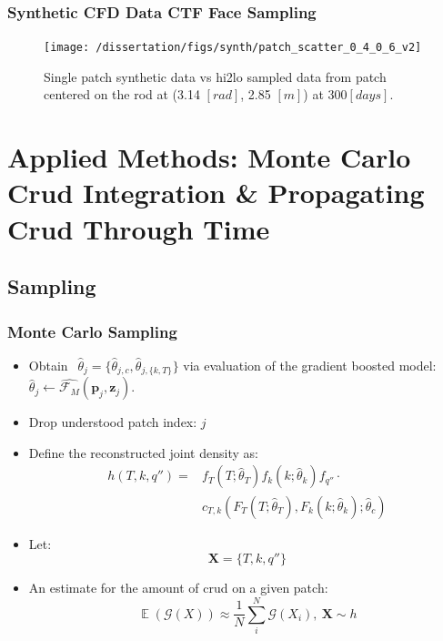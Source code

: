 \documentclass[t, pdftex]{beamer}
\DeclareMathOperator*{\E}{\mathbb{E}}
\begin{document}
\begin{frame}
\frametitle{Synthetic CFD Data CTF Face Sampling}
\vspace{-18pt}
\begin{figure}[H]
    \centering
    \texttt{[image: /dissertation/figs/synth/patch\_scatter\_0\_4\_0\_6\_v2]}
    \caption{\centering Single patch synthetic data vs hi2lo sampled data from patch centered on the rod at (3.14 $[rad]$, 2.85 $[m]$) at 300$[days]$.}
    \label{fig:patchscatter}
\end{figure}
\end{frame}

\section[Applied Methods]{Applied Methods: Monte Carlo Crud Integration \& Propagating Crud Through Time}
\subsection*{Sampling}
\begin{frame}
\frametitle{Monte Carlo Sampling}
\vspace{-16pt}
\begin{itemize}
    \item Obtain $\ \ \hat \theta_j = \{\hat \theta_{j,c}, \hat \theta_{j,\{k, T\}} \}$ via evaluation of the gradient boosted model: $\hat \theta_j \leftarrow \hat{\mathcal F_M}(\mathbf p_j, \mathbf z_j)$.
    \item Drop understood patch index: $j$ 
    \item Define the reconstructed joint density as:
\begin{align}
h(T, k, q'') = & f_T(T;\hat \theta_T) f_k(k;\hat \theta_k) f_{q''} \cdot \nonumber \\
& c_{T,k}(F_T(T;\hat \theta_{T}),F_k(k;\hat \theta_{k});\hat \theta_c) \nonumber
\label{eq:joint_t_tke_q}
\end{align} 

\item Let:
\[ \mathbf X=\{T, k, q''\} \]

\item An estimate for the amount of crud on a given patch:
\begin{equation}
\E(\mathcal G(X)) \approx \frac{1}{N} \sum_i^N \mathcal G(X_i), \ \mathbf{X} \sim {h} \nonumber
\label{eq:mc_expected_crud}
\end{equation}
\end{itemize}
\end{frame}
\end{document}
